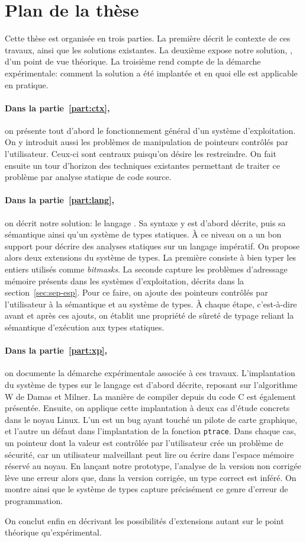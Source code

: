 \section{Plan de la thèse}

Cette thèse est organisée en trois parties. La première décrit le contexte de
ces travaux, ainsi que les solutions existantes. La deuxième expose notre
solution, \langname, d'un point de vue théorique. La troisième rend compte de la
démarche expérimentale: comment la solution a été implantée et en quoi elle est
applicable en pratique.

\paragraph{Dans la partie~\ref{part:ctx},} on présente tout d'abord le
fonctionnement général d'un système d'exploitation. On y introduit aussi les
problèmes de manipulation de pointeurs contrôlés par l'utilisateur. Ceux-ci sont
centraux puisqu'on désire les restreindre. On fait ensuite un tour d'horizon des
techniques existantes permettant de traiter ce problème par analyse statique de
code source.

\paragraph{Dans la partie~\ref{part:lang},} on décrit notre solution: le langage
\langname{}. Sa syntaxe y est d'abord décrite, puis sa sémantique ainsi qu'un
système de types statiques. À ce niveau on a un bon support pour décrire des
analyses statiques sur un langage impératif. On propose alors deux extensions du
système de types. La première consiste à bien typer les entiers utilisés comme
\emph{bitmasks}. La seconde capture les problèmes d'adressage mémoire présents
dans les systèmes d'exploitation, décrits dans la section~\ref{sec:sep-esp}.
Pour ce faire, on ajoute des pointeurs contrôlés par l'utilisateur à la
sémantique et au système de types. À chaque étape, c'est-à-dire avant et après
ces ajouts, on établit une propriété de sûreté de typage reliant la sémantique
d'exécution aux types statiques.

\paragraph{Dans la partie~\ref{part:xp},} on documente la démarche expérimentale
associée à ces travaux. L'implantation du système de types sur le langage
\newspeak est d'abord décrite, reposant sur l'algorithme W de Damas et Milner.
La manière de compiler depuis du code C est également présentée. Ensuite, on
applique cette implantation à deux cas d'étude concrets dans le noyau Linux.
L'un est un bug ayant touché un pilote de carte graphique, et l'autre un défaut
dans l'implantation de la fonction \texttt{ptrace}. Dans chaque cas, un pointeur
dont la valeur est contrôlée par l'utilisateur crée un problème de sécurité, car
un utilisateur malveillant peut lire ou écrire dans l'espace mémoire réservé au
noyau. En lançant notre prototype, l'analyse de la version non corrigée lève une
erreur alors que, dans la version corrigée, un type correct est inféré. On
montre ainsi que le système de types capture précisément ce genre d'erreur de
programmation.

On conclut enfin en décrivant les possibilités d'extensions autant sur le point
théorique qu'expérimental.

